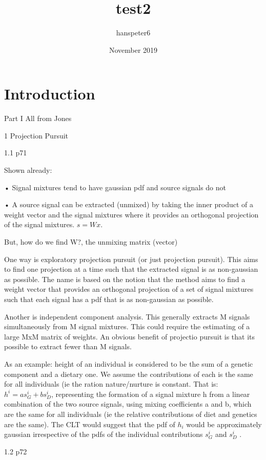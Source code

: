 \documentclass{article}
\title{test2}
\author{hanspeter6 }
\date{November 2019}
\begin{document}
\maketitle

\section{Introduction}


Part I All from Jones

1 Projection Pursuit

1.1 p71

Shown already:

• Signal mixtures tend to have gaussian pdf and source signals do not

• A source signal can be extracted (unmixed) by taking the inner product of a weight vector and the signal mixtures where it provides an orthogonal projection of the signal mixtures. $s=Wx$.

But, how do we find W?, the unmixing matrix (vector)

One way is exploratory projection pursuit (or just projection pursuit). This aims to find one projection at a time such that the extracted signal is as non-gaussian as possible. The name is based on the notion that the method aims to find a weight vector that provides an orthogonal projection of a set of signal mixtures such that each signal has a pdf that is as non-gaussian as possible.

Another is independent component analysis. This generally extracts M signals simultaneously from M signal mixtures. This could require the estimating of a large MxM matrix of weights. An obvious benefit of projectio pursuit is that its possible to extract fewer than M signals.

As an example: height of an individual is considered to be the sum of a genetic component and a dietary one. We assume the contributions of each is the same for all individuals (ie the ration nature/nurture is constant. That is: $h^{i}=as_{G}^{i}+bs_{D}^{i}$, representing the formation of a signal mixture h from a linear combination of the two source signals, using mixing coefficients a and b, which are the same for all individuals (ie the relative contributions of diet and genetics are the same). The CLT would suggest that the pdf of $h_{i}$ would be approximately gaussian irrespective of the pdfs of the individual contributions $s_{G}^{i}$ and $s_{D}^{i}$ .

1.2 p72
\end{document}
